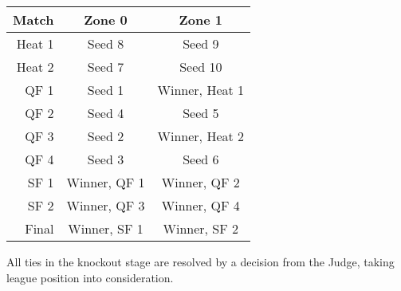 \begin{center}
  \begin{tabular}{r|cc}
  \toprule
  \textbf{Match} & \textbf{Zone 0} & \textbf{Zone 1} \\
  \midrule
  Heat 1 & Seed 8
         & Seed 9 \\
  Heat 2 & Seed 7
         & Seed 10 \\
  QF 1 & Seed 1
       & Winner, Heat 1 \\
  QF 2 & Seed 4
       & Seed 5 \\
  QF 3 & Seed 2
       & Winner, Heat 2 \\
  QF 4 & Seed 3
       & Seed 6 \\
  SF 1 & Winner, QF 1
       & Winner, QF 2 \\
  SF 2 & Winner, QF 3
       & Winner, QF 4 \\
  Final & Winner, SF 1
        & Winner, SF 2 \\
  \bottomrule
  \end{tabular}
\end{center}

All ties in the knockout stage are resolved by a decision from the Judge, taking
league position into consideration.

